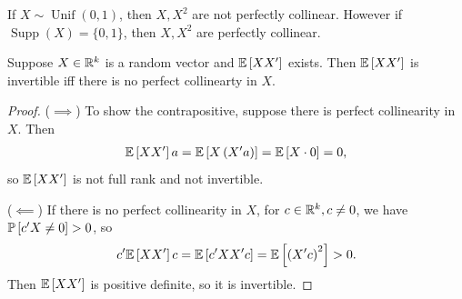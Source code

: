 \begin{example}
	If $X \sim \operatorname{Unif}(0,1)$, then $X,X^2$ are not perfectly collinear. However if $\operatorname{Supp}(X) = \{0,1\}$, then $X,X^2$ are perfectly collinear.
\end{example}

\begin{lemma}	Suppose $X \in \R^k$ is a random vector and $\E\left[XX'\right] $ exists. Then $\E\left[XX'\right] $ is invertible iff there is no perfect collinearty in $X$.
\end{lemma}

\begin{proof}
	($\implies$) To show the contrapositive, suppose there is perfect collinearity in $X$. Then
	\begin{align*}
		\E\left[XX'\right] a = \E\left[X \left( X'a \right)\right] = \E\left[X \cdot 0\right] = 0
		,\end{align*}so $\E\left[XX'\right]$ is not full rank and not invertible.

	($\impliedby$) If there is no perfect collinearity in $X$, for $c \in \R^k, c \ne 0$, we have $\P\left[c' X \ne 0\right] > 0$, so \[
		c' \E\left[XX'\right] c = \E\left[c'XX'c\right] = \E\left[\left( X' c \right)^2\right] > 0
		.\] Then $\E\left[XX'\right] $ is positive definite, so it is invertible.
\end{proof}


